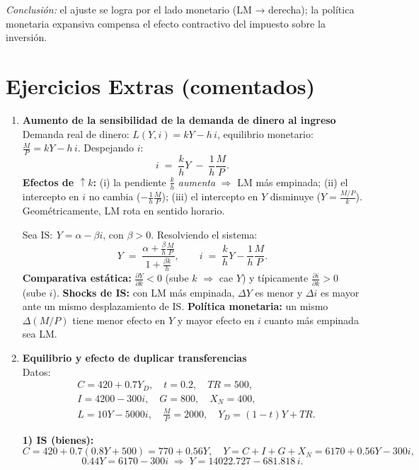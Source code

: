 \documentclass[11pt,addpoints]{article}
\begin{document}
\begin{enumerate}
\textit{Conclusión:} el ajuste se logra por el lado monetario (LM → derecha); la política monetaria expansiva compensa el efecto contractivo del impuesto sobre la inversión.



\section*{Ejercicios Extras (comentados)}
\begin{enumerate}[label=\arabic*.]
\item \textbf{Aumento de la sensibilidad de la demanda de dinero al ingreso}\\
Demanda real de dinero: $L(Y,i)=kY-h\,i$, equilibrio monetario: $\tfrac{M}{P}=kY-h\,i$.
Despejando $i$:
\[
i \;=\; \frac{k}{h}Y \;-\; \frac{1}{h}\frac{M}{P}.
\]
\textbf{Efectos de $\uparrow k$:} 
(i) la pendiente $\frac{k}{h}$ \emph{aumenta} $\Rightarrow$ LM más empinada; 
(ii) el intercepto en $i$ no cambia ($-\tfrac{1}{h}\tfrac{M}{P}$); 
(iii) el intercepto en $Y$ disminuye ($Y=\tfrac{M/P}{k}$). 
Geométricamente, LM rota en sentido horario.

Sea $\text{IS}: \ Y=\alpha-\beta i$, con $\beta>0$. 
Resolviendo el sistema:
\[
Y \;=\; \frac{\alpha + \tfrac{\beta}{h}\tfrac{M}{P}}{1+\tfrac{\beta k}{h}},
\qquad
i \;=\; \frac{k}{h}Y - \frac{1}{h}\frac{M}{P}.
\]
\textbf{Comparativa estática:} $\tfrac{\partial Y}{\partial k}<0$ (sube $k$ $\Rightarrow$ cae $Y$) y típicamente $\tfrac{\partial i}{\partial k}>0$ (sube $i$).
\textbf{Shocks de IS:} con LM más empinada, $\Delta Y$ es menor y $\Delta i$ es mayor ante un mismo desplazamiento de IS.
\textbf{Política monetaria:} un mismo $\Delta(M/P)$ tiene menor efecto en $Y$ y mayor efecto en $i$ cuanto más empinada sea LM.




\item \textbf{Equilibrio y efecto de duplicar transferencias}\\
Datos:
\[
\begin{aligned}
&C = 420 + 0.7Y_D,\quad t=0.2,\quad TR=500,\\
&I = 4200 - 300i,\quad G=800,\quad X_N=400,\\
&L = 10Y - 5000i,\quad \tfrac{M}{P}=2000,\quad Y_D=(1-t)Y+TR.
\end{aligned}
\]

\textbf{1) IS (bienes):} 
\[
C = 420 + 0.7(0.8Y + 500) = 770 + 0.56Y,\quad
Y = C + I + G + X_N = 6170 + 0.56Y - 300i,
\]
\[
0.44Y = 6170 - 300i \;\Rightarrow\; \boxed{Y = 14022.727 - 681.818\, i}.
\]


\end{enumerate}
\end{enumerate}
\end{document}
